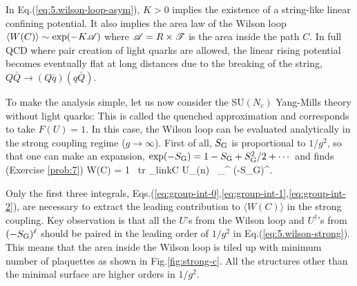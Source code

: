 In Eq.(\ref{eq:5.wilson-loop-asym}), 
   $K > 0$  implies 
 the existence of a string-like
linear confining potential.
 It also implies 
 the area law  of the Wilson loop 
 $\langle W(C) \rangle \sim \exp(-K{\cal A})$
 where ${\cal A}= R \times {\cal T} $ is 
  the area inside the path $C$.
    In full QCD where pair creation of light quarks 
 are allowed,  
  the linear rising potential becomes eventually 
    flat at long distances due to the breaking of the string,
  $Q\bar{Q} \rightarrow (Q\bar{q})(q\bar{Q})$.
  
  To make the analysis simple, let us now consider the 
  SU$(N_c)$ Yang-Mills theory
  without light quarks: This is called the quenched 
  approximation and corresponds to take $F(U) =1$.
In this case,  the Wilson loop can be evaluated analytically
 in the strong coupling regime ($g \rightarrow \infty$).
First of all,  $S_{\rm G}$ is proportional to $1/g^2$,
so that  one can make an expansion,  
$\exp (-S_{\rm G}) = 1 - S_{\rm G}+ S_{\rm G}^2 /2 + \cdots $
 and finds (Exercise \ref{prob:7})
\beq
\label{eq:5.wilson-strong}
\langle W(C) \rangle = {1 }
 \int [dU] \ {\rm tr} \prod_{{\rm link}\in C} U_{\mu}(n) \  
 \sum_{}^{\infty}  (-S_{\rm G})^{\ell}.
\eeq
 
Only the first three integrals, Eqs.(\ref{eq:group-int-0},\ref{eq:group-int-1},\ref{eq:group-int-2}),
 are necessary to extract the leading contribution to 
 $\langle W(C) \rangle $  in the strong coupling.
   Key observation is that all the $U$'s 
  from the Wilson loop and $U^{\dagger}$'s 
 from $(-S_{\rm G})^{\ell}$ should be paired in the leading order of $1/g^2$
 in   Eq.(\ref{eq:5.wilson-strong}).
  This means that the area inside the Wilson loop is tiled up 
 with minimum number of plaquettes as shown in
  Fig.\ref{fig:strong-c}. All the structures other than 
  the minimal surface are higher orders in  $1/g^2$.

